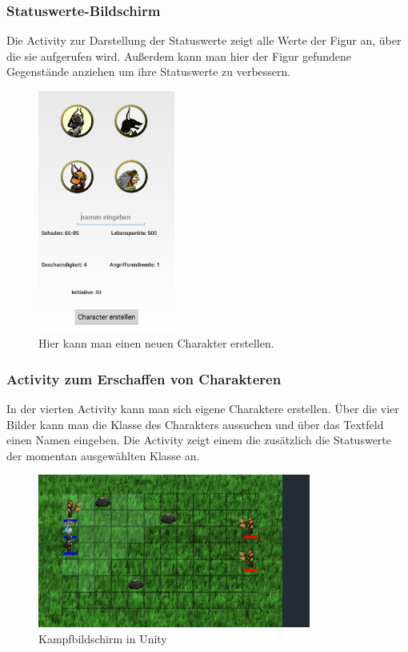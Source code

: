 \documentclass[extern,palatino]{cgBA}
\begin{document}
\subsubsection{Statuswerte-Bildschirm}
Die Activity zur Darstellung der Statuswerte zeigt alle Werte der Figur an, über die sie aufgerufen wird. Außerdem kann man hier der Figur gefundene Gegenstände anziehen um ihre Statuswerte zu verbessern.
\newpage
\begin{figure}[htb] 
	\centering
	\includegraphics[width=0.4\textwidth]{createcharscreen.png}
	\caption{Hier kann man einen neuen Charakter erstellen.}
	\label{fig:Bild5}
\end{figure} 
\subsubsection{Activity zum Erschaffen von Charakteren}
In der vierten Activity kann man sich eigene Charaktere erstellen. Über die vier Bilder kann man die Klasse des Charakters aussuchen und über das Textfeld einen Namen eingeben. Die Activity zeigt einem die zusätzlich die Statuswerte der momentan ausgewählten Klasse an.
\newpage
\begin{figure}[htb]
	\centering
	\includegraphics[width=0.8\textwidth]{fightscreen.png}
	\caption{Kampfbildschirm in Unity}
	\label{fightscreen}
\end{figure}
\end{document}
